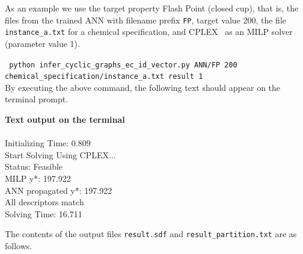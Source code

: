 \documentclass[11pt, titlepage, dvipdfmx, twoside]{article}
\begin{document}
As an example we use the target property Flash Point (closed cup), 
that is, the files from the trained ANN with filename prefix {\tt FP},
target value 200,
the file {\tt instance\_a.txt} for a chemical specification,
and CPLEX~\cite{cplex} as an MILP solver (parameter value 1).

{\tt 
 python infer\_cyclic\_graphs\_ec\_id\_vector.py 
ANN/FP
200 \\
 \phantom{python } 
chemical\_specification/instance\_a.txt
result
1
 }\\


By executing the above command, the following text should appear on the terminal prompt.

\bigskip

\begin{oframed}
{\bf Text output on the terminal}\\\\
 Initializing Time: 0.809  \\
Start Solving Using CPLEX...\\
Status: Feasible 		\\
MILP y*: 197.922 		\\
ANN propagated y*: 197.922 \\
All descriptors match    	\\
Solving Time: 16.711       
\end{oframed}

The contents of the output files {\tt result.sdf} and
{\tt result\_partition.txt} are as follows.

\bigskip
\end{document}
